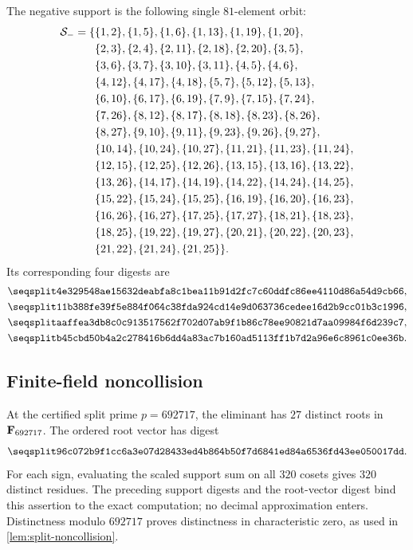 The negative support is the following single $81$-element orbit:
\begingroup\small
\begin{equation*}
\begin{aligned}
\mathcal{S}_-=\{&\{1,2\},\{1,5\},\{1,6\},\{1,13\},\{1,19\},\{1,20\},\\
&\{2,3\},\{2,4\},\{2,11\},\{2,18\},\{2,20\},\{3,5\},\\
&\{3,6\},\{3,7\},\{3,10\},\{3,11\},\{4,5\},\{4,6\},\\
&\{4,12\},\{4,17\},\{4,18\},\{5,7\},\{5,12\},\{5,13\},\\
&\{6,10\},\{6,17\},\{6,19\},\{7,9\},\{7,15\},\{7,24\},\\
&\{7,26\},\{8,12\},\{8,17\},\{8,18\},\{8,23\},\{8,26\},\\
&\{8,27\},\{9,10\},\{9,11\},\{9,23\},\{9,26\},\{9,27\},\\
&\{10,14\},\{10,24\},\{10,27\},\{11,21\},\{11,23\},\{11,24\},\\
&\{12,15\},\{12,25\},\{12,26\},\{13,15\},\{13,16\},\{13,22\},\\
&\{13,26\},\{14,17\},\{14,19\},\{14,22\},\{14,24\},\{14,25\},\\
&\{15,22\},\{15,24\},\{15,25\},\{16,19\},\{16,20\},\{16,23\},\\
&\{16,26\},\{16,27\},\{17,25\},\{17,27\},\{18,21\},\{18,23\},\\
&\{18,25\},\{19,22\},\{19,27\},\{20,21\},\{20,22\},\{20,23\},\\
&\{21,22\},\{21,24\},\{21,25\}\}.
\end{aligned}
\end{equation*}
\endgroup
Its corresponding four digests are
\begin{align*}
&\hexsha{4e329548ae15632deabfa8c1bea11b91d2fc7c60ddfc86ee4110d86a54d9cb66},\\
&\hexsha{11b388fe39f5e884f064c38fda924cd14e9d063736cedee16d2b9cc01b3c1996},\\
&\hexsha{aaffea3db8c0c913517562f702d07ab9f1b86c78ee90821d7aa09984f6d239c7},\\
&\hexsha{b45cbd50b4a2c278416b6dd4a83ac7b160ad5113ff1b7d2a96e6c8961c0ee36b}.
\end{align*}

\subsection{Finite-field noncollision}

At the certified split prime $p=692717$, the eliminant has $27$ distinct
roots in $\mathbf{F}_{692717}$.  The ordered root vector has digest
\[
 \hexsha{96c072b9f1cc6a3e07d28433ed4b864b50f7d6841ed84a6536fd43ee050017dd}.
\]
For each sign, evaluating the scaled support sum on all $320$ cosets gives
$320$ distinct residues.  The preceding support digests and the
root-vector digest bind this assertion to the exact computation; no
decimal approximation enters.  Distinctness modulo $692717$ proves
distinctness in characteristic zero, as used in
\cref{lem:split-noncollision}.

